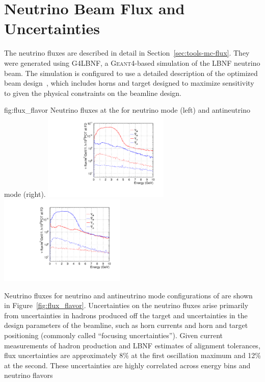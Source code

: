 \section{Neutrino Beam Flux and Uncertainties}\label{sec:nu-osc-04}
\label{sec:physics-lbnosc-flux}

The neutrino fluxes are described in detail in Section~\ref{sec:tools-mc-flux}.  They were generated using G4LBNF, a \textsc{Geant}4\xspace-based simulation of the LBNF neutrino beam.  The simulation is configured to use a detailed description of the  optimized beam design~\cite{optimizedbeamcdr}, which includes horns and target designed to maximize sensitivity to  given the physical constraints on the beamline design.   

\begin{dunefigure}{fig:flux_flavor}
{Neutrino fluxes at the  for neutrino mode (left) and
antineutrino mode (right). }
    \includegraphics[width=0.45\textwidth]{graphics/dune_neutrino_fd_log.pdf}
     \includegraphics[width=0.45\textwidth]{graphics/dune_antineutrino_fd_log.pdf}
\end{dunefigure}

Neutrino fluxes for neutrino and antineutrino mode configurations of  are shown in Figure~\ref{fig:flux_flavor}.   Uncertainties on the neutrino fluxes arise primarily from uncertainties in hadrons produced off the target and uncertainties in the design parameters of the beamline, such as horn currents and horn and target positioning (commonly called ``focusing uncertainties''). Given current measurements of hadron production and LBNF estimates of alignment tolerances, flux uncertainties are approximately 8\% at the first oscillation maximum and 12\% at the second.  These uncertainties are highly correlated across energy bins and neutrino flavors

